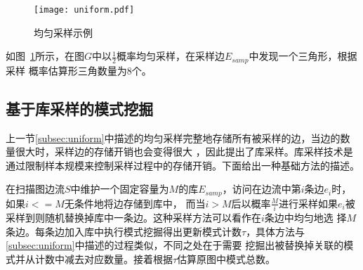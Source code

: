 \documentclass[master]{thesis-uestc}
\begin{document}
\begin{figure}
	\texttt{[image: uniform.pdf]}
	\caption{均匀采样示例}
	\label{fig:uniform}
\end{figure}
     如图~\ref{fig:uniform}所示，在图$G$中以$\frac{1}{2}$概率均匀采样，在采样边$E_{samp}$中发现一个三角形，根据采样
概率估算形三角数量为8个。

\subsection{基于库采样的模式挖掘}
\label{subsec:reservoir}
    上一节\ref{subsec:uniform}中描述的均匀采样完整地存储所有被采样的边，当边的数量很大时，采样边的存储开销也会变得很大
，因此提出了库采样。库采样技术是通过限制样本规模来控制采样过程中的存储开销。下面给出一种基础方法的描述。

    在扫描图边流$S$中维护一个固定容量为$M$的库$E_{samp}$，访问在边流中第$i$条边$e_i$时，如果$i<=M$无条件地将边存储到库中，
而当$i>M$后以概率$\frac{M}{i}$进行采样如果$e_i$被采样到则随机替换掉库中一条边。这种采样方法可以看作在$i$条边中均匀地选
择$M$条边。每条边加入库中执行模式挖掘得出更新模式计数$\tau$，具体方法与\ref{subsec:uniform}中描述的过程类似，不同之处在于需要
挖掘出被替换掉关联的模式并从计数中减去对应数量。接着根据$\tau$估算原图中模式总数。
\end{document}
